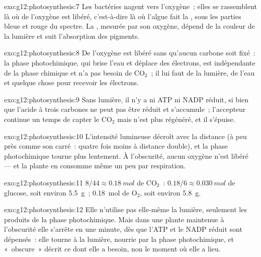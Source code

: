 \begin{solution}{exo:g12:photosynthesis:7}
Les bactéries nagent vers l'oxygène~; elles se rassemblent là où de
l'oxygène est libéré, c'est-à-dire là où l'algue fait la
, sous les parties bleue et rouge du spectre. La
, mesurée par son oxygène, dépend de la couleur de la
lumière et suit l'absorption des pigments.
\end{solution}

\begin{solution}{exo:g12:photosynthesis:8}
De l'oxygène est libéré sans qu'aucun carbone soit fixé~: la phase
photochimique, qui brise l'eau et déplace des électrons, est
indépendante de la phase chimique et n'a pas besoin de
$\mathrm{CO_2}$~; il lui faut de la lumière, de l'eau et quelque chose
pour recevoir les électrons.
\end{solution}

\begin{solution}{exo:g12:photosynthesis:9}
Sans lumière, il n'y a ni ATP ni NADP réduit, si bien que l'acide à
trois carbones ne peut pas être réduit et s'accumule~; l'accepteur
continue un temps de capter le $\mathrm{CO_2}$ mais n'est plus
régénéré, et il s'épuise.
\end{solution}

\begin{solution}{exo:g12:photosynthesis:10}
L'intensité lumineuse décroît avec la distance (à peu près comme son
carré~: quatre fois moins à distance double), et la phase
photochimique tourne plus lentement. À l'obscurité, aucun oxygène
n'est libéré --- et la plante en consomme même un peu par respiration.
\end{solution}

\begin{solution}{exo:g12:photosynthesis:11}
$8/44 \approx \qty{0.18}{mol}$ de $\mathrm{CO_2}$~: $0.18/6 \approx
\qty{0.030}{mol}$ de glucose, soit environ \qty{5.5}{g}~;
\qty{0.18}{mol} de $\mathrm{O_2}$, soit environ \qty{5.8}{g}.
\end{solution}

\begin{solution}{exo:g12:photosynthesis:12}
Elle n'utilise pas elle-même la lumière, seulement les produits de la
phase photochimique. Mais dans une plante maintenue à l'obscurité elle
s'arrête en une minute, dès que l'ATP et le NADP réduit sont
dépensés~: elle tourne à la lumière, nourrie par la phase
photochimique, et «~obscure~» décrit ce dont elle a besoin, non le
moment où elle a lieu.
\end{solution}

